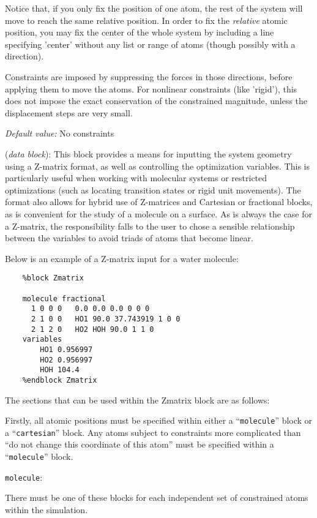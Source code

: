\documentclass[11pt]{article}
\begin{document}
\begin{description}
Notice that, if you only fix the position of one atom, the rest of the
system will move to reach the same relative position. In order to
fix the {\it relative} atomic position, you may fix the center of
the whole system by including a line specifying 'center'
without any list or range of atoms (though possibly with a direction).

Constraints are imposed by suppressing the forces in those directions,
before applying them to move the atoms. For nonlinear constraints
(like 'rigid'), this does not impose the exact conservation of the 
constrained magnitude, unless the displacement steps are very small.

{\it Default value:} No constraints

\item[{\bf Zmatrix}] ({\it data block}): 
This block provides a means for inputting the system geometry using a Z-matrix
format, as well as controlling the optimization variables. This is particularly
useful when working with molecular systems or restricted optimizations (such
as locating transition states or rigid unit movements). The format also
allows for hybrid use of Z-matrices and Cartesian or fractional blocks, as
is convenient for the study of a molecule on a surface.
As is always the case for a Z-matrix, the responsibility falls to the user to
chose a sensible relationship between the variables to avoid triads of atoms
that become linear. 

Below is an example of a Z-matrix input for a water molecule:
\begin{verbatim}
    %block Zmatrix

    molecule fractional
      1 0 0 0   0.0 0.0 0.0 0 0 0
      2 1 0 0   HO1 90.0 37.743919 1 0 0
      2 1 2 0   HO2 HOH 90.0 1 1 0
    variables
        HO1 0.956997
        HO2 0.956997
        HOH 104.4
    %endblock Zmatrix
\end{verbatim}

The sections that can be used within the Zmatrix block are as follows:

Firstly, all atomic positions must be specified within either a 
``\texttt{molecule}'' block or a ``\texttt{cartesian}'' block. 
Any atoms subject to
constraints more complicated than ``do not change this coordinate
of this atom'' must be specified within a ``\texttt{molecule}'' block.

\item \texttt{molecule}: 

There must be one of these blocks for each independent set of
constrained atoms within the simulation.


\end{description}
\end{document}
